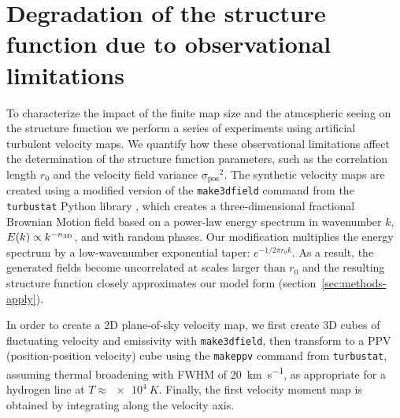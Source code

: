 \documentclass[fleqn,usenatbib, useAMS, a4paper]{mnras}
\newcommand\startNEW{\color{black}}
\newcommand\stopNEW{\color{black}}
\newcommand\NEW[1]{\startNEW #1\stopNEW\relax}
\newcommand\pos{\ensuremath{_{\mathrm{pos}}}}
\begin{document}





\appendix

\renewcommand\textfraction{0.0}
\renewcommand\topfraction{1.0}
\renewcommand\bottomfraction{1.0}

\startNEW
\section{Degradation of the structure function due to observational limitations}
\label{sec:degr-struct-funct}
\stopNEW

To characterize the impact of the finite map size
and the atmospheric seeing on the structure function we perform a series of experiments using artificial turbulent velocity maps.
We quantify how these observational limitations affect the determination of
the structure function parameters, such as
the correlation length \(r_0\) and the velocity field variance \(\sigma\pos^2\). 
The synthetic velocity maps are created using a modified version of the \NEW{\texttt{make\textunderscore{}3dfield}} command from the \texttt{turbustat} Python library \citep{Koch2019AJ....158....1K},
which creates a \NEW{three-dimensional} fractional Brownian Motion field
\citep{Miville-Deschenes:2003a}
based on a power-law energy spectrum in wavenumber \(k\), \(E(k) \propto k^{-n_{\mathrm{3D}}}\),
and with random phases. 
Our modification multiplies the energy spectrum by a
low-wavenumber exponential taper:
\(e^{-1 / 2 \pi r_0 k}\).
As a result, the generated fields become uncorrelated at scales larger than \(r_0\)
and the resulting structure function closely approximates our model form
(section~\ref{sec:methods-apply}).

\startNEW
In order to create a 2D plane-of-sky velocity map, we first
create 3D cubes of fluctuating velocity and emissivity
with \texttt{make\textunderscore{}3dfield},
then transform to a PPV (position-position velocity) cube
using the \texttt{make\textunderscore{}ppv} command from \texttt{turbustat},
assuming thermal broadening with FWHM of \SI{20}{\kilo\meter\per\second},
as appropriate for a hydrogen line at \(T \approx \SI{e4}{K}\).
Finally, the first velocity moment map is obtained
by integrating along the velocity axis.
\end{document}
